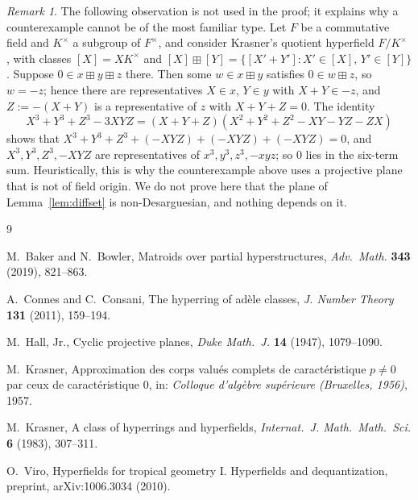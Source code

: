 \documentclass[11pt]{article}
\theoremstyle{definition}
\theoremstyle{remark}
\newtheorem{remark}[theorem]{Remark}
\newcommand{\bp}{\boxplus}
\begin{document}
\begin{remark}\label{rem:quotient}
The following observation is not used in the proof; it explains why a counterexample cannot be of the most familiar type. Let $F$ be a commutative field and $K^\times$ a subgroup of $F^\times$, and consider Krasner's quotient hyperfield $F/K^\times$ \cite{Kr83}, with classes $[X]=XK^\times$ and $[X]\bp[Y]=\{[X'+Y']:X'\in[X],\,Y'\in[Y]\}$. Suppose $0\in x\bp y\bp z$ there. Then some $w\in x\bp y$ satisfies $0\in w\bp z$, so $w=-z$; hence there are representatives $X\in x$, $Y\in y$ with $X+Y\in -z$, and $Z:=-(X+Y)$ is a representative of $z$ with $X+Y+Z=0$. The identity
\[
X^3+Y^3+Z^3-3XYZ=(X+Y+Z)(X^2+Y^2+Z^2-XY-YZ-ZX)
\]
shows that $X^3+Y^3+Z^3+(-XYZ)+(-XYZ)+(-XYZ)=0$, and $X^3,Y^3,Z^3,-XYZ$ are representatives of $x^3,y^3,z^3,-xyz$; so $0$ lies in the six-term sum. Heuristically, this is why the counterexample above uses a projective plane that is not of field origin. We do not prove here that the plane of Lemma~\ref{lem:diffset} is non-Desarguesian, and nothing depends on it.

\end{remark}

\begin{thebibliography}{9}

M.~Baker and N.~Bowler,
Matroids over partial hyperstructures,
\emph{Adv.\ Math.} \textbf{343} (2019), 821--863.

A.~Connes and C.~Consani,
The hyperring of ad\`ele classes,
\emph{J. Number Theory} \textbf{131} (2011), 159--194.

M.~Hall, Jr.,
Cyclic projective planes,
\emph{Duke Math.\ J.} \textbf{14} (1947), 1079--1090.

M.~Krasner,
Approximation des corps valu\'es complets de caract\'eristique $p\neq0$ par ceux de caract\'eristique $0$,
in: \emph{Colloque d'alg\`ebre sup\'erieure (Bruxelles, 1956)}, 1957.

M.~Krasner,
A class of hyperrings and hyperfields,
\emph{Internat.\ J. Math.\ Math.\ Sci.} \textbf{6} (1983), 307--311.

O.~Viro,
Hyperfields for tropical geometry I. Hyperfields and dequantization,
preprint, arXiv:1006.3034 (2010).

\end{thebibliography}
\end{document}
